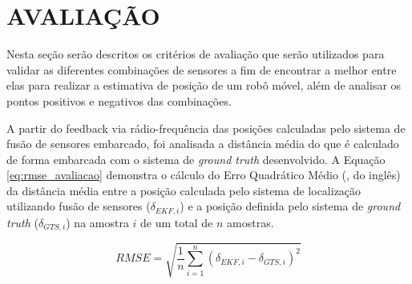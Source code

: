 \documentclass[acronym, symbols, table]{fei}
\begin{document}
%		
%		
%		
		
	\section{AVALIAÇÃO}\label{sec:metodologia_avaliacao}
	
		Nesta seção serão descritos os critérios de avaliação que serão utilizados para validar as diferentes combinações de sensores a fim de encontrar a melhor entre elas para realizar a estimativa de posição de um robô móvel, além de analisar os pontos positivos e negativos das combinações.
		
		A partir do feedback via rádio-frequência das posições calculadas pelo sistema de fusão de sensores embarcado, foi analisada a distância média do que é calculado de forma embarcada com o sistema de \textit{ground truth} desenvolvido. A Equação \ref{eq:rmse_avaliacao} demonstra o cálculo do Erro Quadrático Médio (, do inglês) da distância média entre a posição calculada pelo sistema de localização utilizando fusão de sensores ($\delta_{EKF, i}$) e a posição definida pelo sistema de \textit{ground truth} ($\delta_{GTS, i}$) na amostra $i$ de um total de $n$ amostras.
		
		\begin{equation}\label{eq:rmse_avaliacao}
			RMSE = \sqrt{\frac{1}{n}\sum_{i=1}^{n}(\delta_{EKF, i} - \delta_{GTS, i})^{2}}
		\end{equation}
	
\end{document}
